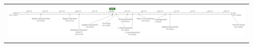 \begin{table}[H]
{\begin{tabular}{lllllll}
\multicolumn{7}{l}{}                                                                                                                                                                                                                                                                                                                                                                                                                                                                                                                                                                                                                                                                                                                                                                                                                                            \\
\multicolumn{7}{c}{\includegraphics[width=2\linewidth]{source/status_report/main/init_timeline}}                                                                                                                                                                                                                                                                                                                                                                                                                                                                                                                                                                                                                                                                                                                                                                                                                                            \\
\multicolumn{7}{l}{}                                                                                                                                                                                                                                                                                                                                                                                                                                                                                                                                                                                                                                                                                                                                                                                                                                            \\

\end{tabular}}
\end{table}
